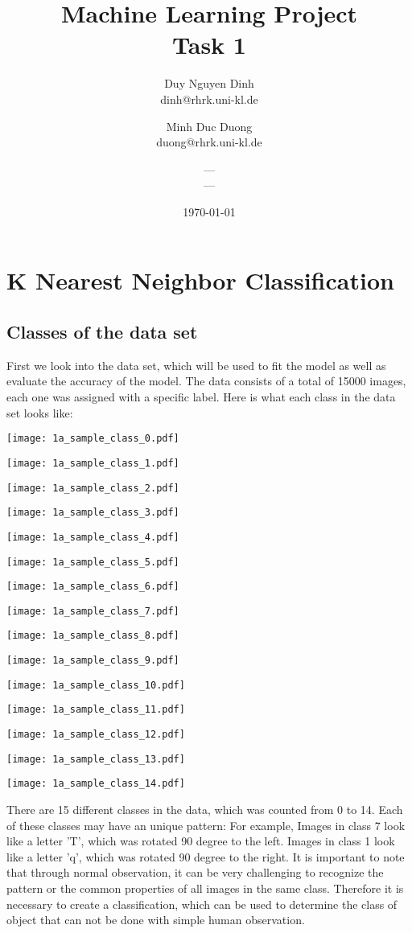 \documentclass[11pt]{article}
\title{Machine Learning Project\\Task 1}
\author{Duy Nguyen Dinh \\ dinh@rhrk.uni-kl.de\and
	Minh Duc Duong\\ duong@rhrk.uni-kl.de\and
    ---\\ ---}
\date{\today}
\begin{document}
\maketitle

\section{K Nearest Neighbor Classification}

\subsection{Classes of the data set}
First we look into the data set, which will be used to fit the model as well as evaluate the accuracy of the model. The data consists of a total of 15000 images, each one was assigned with a specific label. Here is what each class in the data set looks like:

\texttt{[image: 1a\_sample\_class\_0.pdf]}

\texttt{[image: 1a\_sample\_class\_1.pdf]}

\texttt{[image: 1a\_sample\_class\_2.pdf]}

\texttt{[image: 1a\_sample\_class\_3.pdf]}

\texttt{[image: 1a\_sample\_class\_4.pdf]}

\texttt{[image: 1a\_sample\_class\_5.pdf]}

\texttt{[image: 1a\_sample\_class\_6.pdf]}

\texttt{[image: 1a\_sample\_class\_7.pdf]}

\texttt{[image: 1a\_sample\_class\_8.pdf]}

\texttt{[image: 1a\_sample\_class\_9.pdf]}

\texttt{[image: 1a\_sample\_class\_10.pdf]}

\texttt{[image: 1a\_sample\_class\_11.pdf]}

\texttt{[image: 1a\_sample\_class\_12.pdf]}

\texttt{[image: 1a\_sample\_class\_13.pdf]}

\texttt{[image: 1a\_sample\_class\_14.pdf]}

There are 15 different classes in the data, which was counted from 0 to 14. Each of these classes may have an unique pattern: For example, Images in class 7 look like a letter 'T', which was rotated 90 degree to the left. Images in class 1 look like a letter 'q', which was rotated 90 degree to the right. It is important to note that through normal observation, it can be very challenging to recognize the pattern or the common properties of all images in the same class. Therefore it is necessary to create a classification, which can be used to determine the class of object that can not be done with simple human observation.
\end{document}
